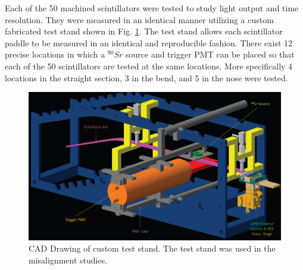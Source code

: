 Each of the 50 machined scintillators were tested to study light output and time resolution.  They were measured in an identical manner utilizing a custom fabricated test stand shown in Fig. \ref{fig:test_stand_model}. The test stand allows each scintillator paddle to be measured in an identical and reproducible fashion.  There exist 12 precise locations in which a $^{90}Sr$ source and trigger PMT can be placed so that each of the 50 scintillators are tested at the same locations.  More specifically 4 locations in the straight section, 3 in the bend, and 5 in the nose were tested.
\begin{figure}[!htb]
	\centering
	\includegraphics[width=1.0\columnwidth]{fabrication/figs/test_stand_model}
	\caption[CAD Drawing of custom test stand]{CAD Drawing of custom test stand.  The test stand was used in the misalignment studies.}
	\label{fig:test_stand_model}
\end{figure}
